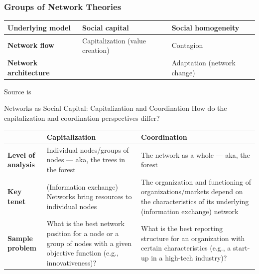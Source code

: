 \documentclass[aspectratio=1610]{beamer}
\begin{document}
\begin{frame}
	\frametitle{Groups of Network Theories}
	\centering
	\small
	\begin{table}
		\begin{center}
			\begin{tabular}[c]{l|l|l}
				\textbf{Underlying model} & 
				\textbf{Social capital} &
				\textbf{Social homogeneity}\\
				\hline
				\textbf{Network flow} &
				Capitalization (value creation) & 
				Contagion  \\
				\hline
				\textbf{Network architecture} &  
				\cellcolor{blue!20}{\color{black}{Coordination}} & 
				Adaptation  (network change)\\
			\end{tabular}
		\end{center}
	\end{table}

	\vspace{1em}

	\raggedright \small Source is~\cite[][page 47]{scott2011}
\end{frame}

\begin{frame}{Networks as Social Capital: Capitalization and Coordination}
	{How do the capitalization and coordination perspectives differ?}
	\small
	\begin{table}
	\begin{center}
		\begin{tabular}[c]{p{2.75cm}|p{4.5cm}|p{4.5cm}}
			\textbf{} &
			\textbf{Capitalization} & 
			\textbf{Coordination} \\
			\hline
			\textbf{Level of analysis} &
			Individual nodes/groups of nodes --- aka, the trees 
			in the forest &
			The network as a whole --- aka, the forest \\ \hline
			\textbf{Key tenet} &
			(Information exchange) Networks bring resources to 
			individual nodes & 
			The organization and functioning of organizations/markets 
			depend on the characteristics of its underlying 
			(information exchange) network \\ \hline
			\textbf{Sample problem} &
			What is the best network position for a node or a group 
			of nodes with a given objective function (e.g.,
			innovativeness)? & What is the best reporting structure
			for an organization with certain characteristics (e.g.,
			a start-up in a high-tech industry)?\\
			\hline
		\end{tabular}
	\end{center}
	\end{table}	
\end{frame}
\end{document}

